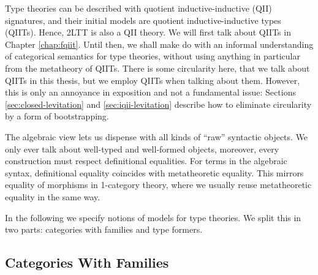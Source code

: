\documentclass[12pt,a4paper,twoside,openany]{book}
\theoremstyle{remark}
\theoremstyle{definition}
\theoremstyle{theorem}
\begin{document}
Type theories can be described with quotient inductive-inductive (QII)
signatures, and their initial models are quotient inductive-inductive types
(QIITs). Hence, 2LTT is also a QII theory. We will first talk about QIITs in
Chapter \ref{chap:fqiit}. Until then, we shall make do with an informal
understanding of categorical semantics for type theories, without using anything
in particular from the metatheory of QIITs. There is some circularity here, that
we talk about QIITs in this thesis, but we employ QIITs when talking about
them. However, this is only an annoyance in exposition and not a fundamental
issue: Sections \ref{sec:closed-levitation} and \ref{sec:iqii-levitation}
describe how to eliminate circularity by a form of bootstrapping.

The algebraic view lets us dispense with all kinds of ``raw'' syntactic objects.
We only ever talk about well-typed and well-formed objects, moreover, every
construction must respect definitional equalities. For terms in the algebraic
syntax, definitional equality coincides with metatheoretic equality. This
mirrors equality of morphisms in 1-category theory, where we usually reuse
metatheoretic equality in the same way.

In the following we specify notions of models for type theories. We split this
in two parts: categories with families and type formers.

\subsection{Categories With Families}
\end{document}
